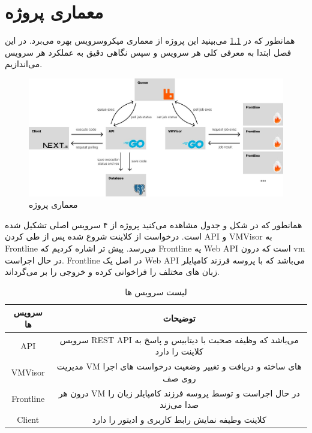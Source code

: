 \chapter{معماری پروژه}

همانطور که در {\ref{fig:architecture}} می‌بینید این پروژه از معماری میکروسرویس بهره می‌برد.
در این فصل ابتدا به معرفی کلی هر سرویس و سپس نگاهی دقیق به عملکرد هر سرویس می‌اندازیم.

\begin{figure}[htbp]
    \centering
    \includegraphics[width=1\textwidth]{./3-Design/design.jpg}
    \caption{معماری پروژه}
    \label{fig:architecture}
\end{figure}

\newpage

همانطور که در شکل و جدول مشاهده می‌کنید پروژه از ۴ سرویس اصلی تشکیل شده است.
درخواست از کلاینت شروع شده پس از طی کردن API و VMVisor به Frontline می‌رسد.
پیش تر اشاره کردیم که Frontline یه Web API است که درون vm در حال اجراست.
Frontline در اصل یک Web API می‌باشد که با پروسه فرزند کامپایلر زبان های مختلف را فراخوانی کرده و خروجی را بر می‌گرداند.


\begin{table}[hb]
    \centering
    \caption{لیست سرویس ها}
    \label{table:services}
    \begin{tabular}{|c|c|}
        \hline
        سرویس ها  & توضیحات                                                                 \\
        \hline

        API       & سرویس REST API می‌باشد که وظیفه صحبت با دیتابیس و پاسخ به کلاینت را دارد \\
        \hline

        VMVisor   & مدیریت VM های ساخته و دریافت و تغییر وضعیت درخواست های اجرا روی صف      \\
        \hline

        Frontline & درون هر VM در حال اجراست و توسط پروسه فرزند کامپایلر زبان را صدا می‌زند  \\
        \hline


        Client    & کلاینت وطیفه نمایش رابط کاربری و ادیتور را دارد                         \\
        \hline
    \end{tabular}
\end{table}


